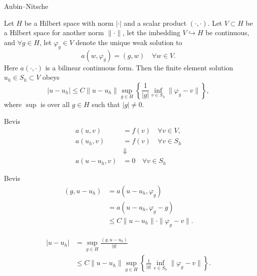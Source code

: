 \begin{frame}{Aubin–Nitsche}
    \begin{theorem}
    Let $H$ be a Hilbert space with norm $|\cdot|$ and a scalar product $(\cdot,\cdot)$.
    Let $V\subset H$ be a Hilbert space for another norm $\|\cdot\|$, let the imbedding
    $V \hookrightarrow H$ be continuous,
    and $\forall g \in H$, let $\varphi_g \in V$ denote the unique weak solution to 
    \begin{equation}
        a(w,\varphi_g) = (g,w) \quad \forall w\in V. \label{eq:aubin_nitsche_antagelse}
    \end{equation}
    Here $a(\cdot,\cdot)$ is a bilinear continuous form.
    Then the finite element solution $u_h\in S_h \subset V$ obeys
    \begin{equation*}
        |u-u_h| \leq C \|u-u_h\| \sup_{g\in H} \left \{ \frac{1}{|g|} \inf_{v \in S_h} \|\varphi_g - v\| \right \},
    \end{equation*}
    where $\sup$ is over all $g\in H$ such that $|g|\neq 0$.
    \end{theorem}
\end{frame}

\begin{frame}{Bevis}
    \begin{align*}
        a(u,v) &= f(v) \quad \forall v \in V, \\
        a(u_h,v) &= f(v) \quad \forall v \in S_h\\
        &\Downarrow \\ 
        a(u-u_h,v) &= 0 \quad \forall v \in S_h
    \end{align*}
\end{frame}
\begin{frame}{Bevis}
    \begin{align*}
        (g,u-u_h) &= a(u-u_h,\varphi _g) \\
                  &=a(u-u_h, \varphi_g -g) \\
                  &\leq C \|u-u_h\| \cdot \|\varphi_g-v\|.
    \end{align*}

    \begin{align*}
        |u-u_h| &= \sup_{g\in H} \frac{(g,u-u_h)}{|g|} \\
        &\leq C \| u-u_h\| \sup_{g\in H} \left \{ \frac{1}{|g|} \inf_{v \in S_h} \|\varphi_g - v\| \right \}.
    \end{align*}
\end{frame}


